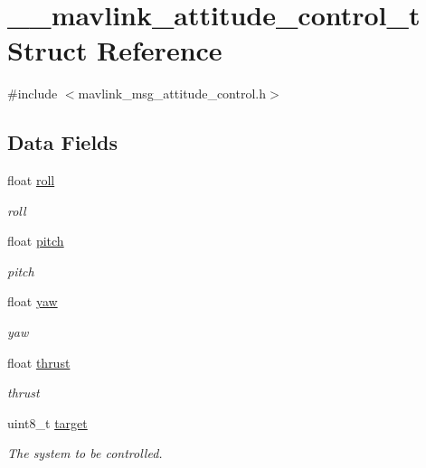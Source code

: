 \hypertarget{struct____mavlink__attitude__control__t}{\section{\+\_\+\+\_\+mavlink\+\_\+attitude\+\_\+control\+\_\+t Struct Reference}
\label{struct____mavlink__attitude__control__t}
}


{\ttfamily \#include $<$mavlink\+\_\+msg\+\_\+attitude\+\_\+control.\+h$>$}

\subsection*{Data Fields}
\begin{DoxyCompactItemize}
\item 
float \hyperlink{struct____mavlink__attitude__control__t_aa1ffb17f566bf25566ac1b9650b77e1e}{roll}
\begin{DoxyCompactList}\small\item\em roll \end{DoxyCompactList}\item 
float \hyperlink{struct____mavlink__attitude__control__t_a6b46edf966d790a711fb33c9b9117fed}{pitch}
\begin{DoxyCompactList}\small\item\em pitch \end{DoxyCompactList}\item 
float \hyperlink{struct____mavlink__attitude__control__t_a6158e550a2e3e6240ed63c77d690af32}{yaw}
\begin{DoxyCompactList}\small\item\em yaw \end{DoxyCompactList}\item 
float \hyperlink{struct____mavlink__attitude__control__t_a60d874733d032996dbc41ddb839f7ef3}{thrust}
\begin{DoxyCompactList}\small\item\em thrust \end{DoxyCompactList}\item 
uint8\+\_\+t \hyperlink{struct____mavlink__attitude__control__t_a7c417a1e1e91a80331685e0764a40059}{target}
\begin{DoxyCompactList}\small\item\em The system to be controlled. \end{DoxyCompactList}\item 

\end{DoxyCompactItemize}
